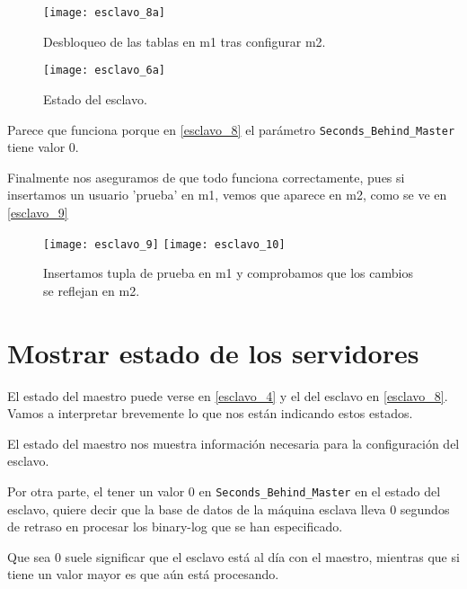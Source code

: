 \begin{figure}[h!]
\begin{center}
\caption{Desbloqueo de las tablas en m1 tras configurar m2.}
\label{esclavo_6}
\texttt{[image: esclavo\_8a]}
\end{center}
\end{figure}

\begin{figure}[h!]
\begin{center}
\caption{Estado del esclavo.}
\label{esclavo_8}
\texttt{[image: esclavo\_6a]}
\end{center}
\end{figure}

Parece que funciona porque en \eqref{esclavo_8} el parámetro \verb|Seconds_Behind_Master| tiene valor 0.

Finalmente nos aseguramos de que todo funciona correctamente, pues si insertamos un usuario 'prueba' en m1, vemos que aparece en m2, como se ve en \eqref{esclavo_9}

\begin{figure}[h!]
\begin{center}
\caption{Insertamos tupla de prueba en m1 y comprobamos que los cambios se reflejan en m2.}
\label{esclavo_9}
\texttt{[image: esclavo\_9]}
\texttt{[image: esclavo\_10]}
\end{center}
\end{figure}



\chapter{Mostrar estado de los servidores}

El estado del maestro puede verse en \eqref{esclavo_4} y el del esclavo en \eqref{esclavo_8}. Vamos a interpretar brevemente lo que nos están indicando estos estados.

El estado del maestro nos muestra información necesaria para la configuración del esclavo.

Por otra parte, el tener un valor $0$ en \verb|Seconds_Behind_Master| en el estado del esclavo, quiere decir que la base de datos de la máquina esclava lleva 0 segundos de retraso en procesar los binary-log que se han especificado.

Que sea 0 suele significar que el esclavo está al día con el maestro, mientras que si tiene un valor mayor es que aún está procesando.

